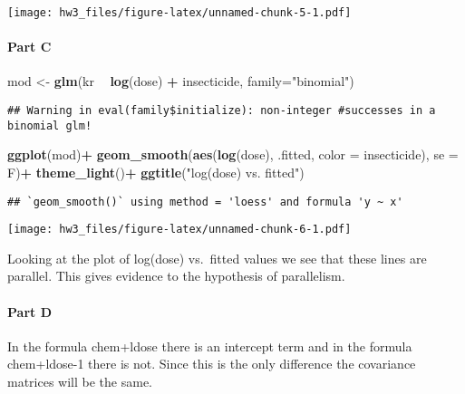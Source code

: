 \documentclass[
]{article}
\newenvironment{Shaded}{\begin{snugshade}}{\end{snugshade}}
\newcommand{\DataTypeTok}[1]{\textcolor[rgb]{0.13,0.29,0.53}{#1}}
\newcommand{\KeywordTok}[1]{\textcolor[rgb]{0.13,0.29,0.53}{\textbf{#1}}}
\newcommand{\NormalTok}[1]{#1}
\newcommand{\OperatorTok}[1]{\textcolor[rgb]{0.81,0.36,0.00}{\textbf{#1}}}
\newcommand{\StringTok}[1]{\textcolor[rgb]{0.31,0.60,0.02}{#1}}
\begin{document}
\texttt{[image: hw3\_files/figure-latex/unnamed-chunk-5-1.pdf]}

\hypertarget{part-c-1}{%
\paragraph{Part C}\label{part-c-1}}

\begin{Shaded}
\begin{Highlighting}[]
\NormalTok{mod <-}\StringTok{ }\KeywordTok{glm}\NormalTok{(kr }\OperatorTok{~}\StringTok{ }\KeywordTok{log}\NormalTok{(dose) }\OperatorTok{+}\StringTok{ }\NormalTok{insecticide, }\DataTypeTok{family=}\StringTok{"binomial"}\NormalTok{)}
\end{Highlighting}
\end{Shaded}

\begin{verbatim}
## Warning in eval(family$initialize): non-integer #successes in a binomial glm!
\end{verbatim}

\begin{Shaded}
\begin{Highlighting}[]
\KeywordTok{ggplot}\NormalTok{(mod)}\OperatorTok{+}
\StringTok{  }\KeywordTok{geom_smooth}\NormalTok{(}\KeywordTok{aes}\NormalTok{(}\KeywordTok{log}\NormalTok{(dose), .fitted, }\DataTypeTok{color =}\NormalTok{ insecticide), }\DataTypeTok{se =}\NormalTok{ F)}\OperatorTok{+}
\StringTok{  }\KeywordTok{theme_light}\NormalTok{()}\OperatorTok{+}
\StringTok{  }\KeywordTok{ggtitle}\NormalTok{(}\StringTok{"log(dose) vs. fitted"}\NormalTok{)}
\end{Highlighting}
\end{Shaded}

\begin{verbatim}
## `geom_smooth()` using method = 'loess' and formula 'y ~ x'
\end{verbatim}

\texttt{[image: hw3\_files/figure-latex/unnamed-chunk-6-1.pdf]}

Looking at the plot of log(dose) vs.~fitted values we see that these
lines are parallel. This gives evidence to the hypothesis of
parallelism.

\hypertarget{part-d-1}{%
\paragraph{Part D}\label{part-d-1}}

In the formula chem+ldose there is an intercept term and in the formula
chem+ldose-1 there is not. Since this is the only difference the
covariance matrices will be the same.
\end{document}
